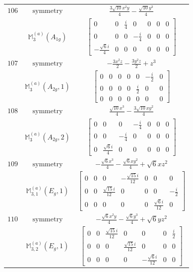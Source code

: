 \documentclass[fleqn,8pt,landscape]{jsarticle}
\begin{document}
\begin{longtable}{ccc}
$ 106 $ & $ \text{symmetry} $ & $ \frac{3 \sqrt{10} x^{2} y}{4} - \frac{\sqrt{10} y^{3}}{4} $ \\
$  $ & $ \mathbb{M}_{3}^{(a)}(A_{1g}) $ & $ \begin{bmatrix} 0 & 0 & \frac{i}{4} & 0 & 0 & 0 & 0 \\ 0 & 0 & 0 & - \frac{i}{4} & 0 & 0 & 0 \\ - \frac{\sqrt{6} i}{4} & 0 & 0 & 0 & 0 & 0 & 0 \end{bmatrix} $ \\ \hline
$ 107 $ & $ \text{symmetry} $ & $ - \frac{3 x^{2} z}{2} - \frac{3 y^{2} z}{2} + z^{3} $ \\
$  $ & $ \mathbb{M}_{3}^{(a)}(A_{2g},1) $ & $ \begin{bmatrix} 0 & 0 & 0 & 0 & 0 & - \frac{i}{2} & 0 \\ 0 & 0 & 0 & 0 & \frac{i}{2} & 0 & 0 \\ 0 & 0 & 0 & 0 & 0 & 0 & 0 \end{bmatrix} $ \\ \hline
$ 108 $ & $ \text{symmetry} $ & $ \frac{\sqrt{10} x^{3}}{4} - \frac{3 \sqrt{10} x y^{2}}{4} $ \\
$  $ & $ \mathbb{M}_{3}^{(a)}(A_{2g},2) $ & $ \begin{bmatrix} 0 & 0 & 0 & - \frac{i}{4} & 0 & 0 & 0 \\ 0 & 0 & - \frac{i}{4} & 0 & 0 & 0 & 0 \\ 0 & \frac{\sqrt{6} i}{4} & 0 & 0 & 0 & 0 & 0 \end{bmatrix} $ \\ \hline
$ 109 $ & $ \text{symmetry} $ & $ - \frac{\sqrt{6} x^{3}}{4} - \frac{\sqrt{6} x y^{2}}{4} + \sqrt{6} x z^{2} $ \\
$  $ & $ \mathbb{M}_{3,1}^{(a)}(E_{g},1) $ & $ \begin{bmatrix} 0 & 0 & 0 & - \frac{\sqrt{15} i}{12} & 0 & 0 & 0 \\ 0 & 0 & \frac{\sqrt{15} i}{12} & 0 & 0 & 0 & - \frac{i}{2} \\ 0 & 0 & 0 & 0 & 0 & \frac{\sqrt{6} i}{12} & 0 \end{bmatrix} $ \\ \hline
$ 110 $ & $ \text{symmetry} $ & $ - \frac{\sqrt{6} x^{2} y}{4} - \frac{\sqrt{6} y^{3}}{4} + \sqrt{6} y z^{2} $ \\
$  $ & $ \mathbb{M}_{3,2}^{(a)}(E_{g},1) $ & $ \begin{bmatrix} 0 & 0 & \frac{\sqrt{15} i}{12} & 0 & 0 & 0 & \frac{i}{2} \\ 0 & 0 & 0 & \frac{\sqrt{15} i}{12} & 0 & 0 & 0 \\ 0 & 0 & 0 & 0 & - \frac{\sqrt{6} i}{12} & 0 & 0 \end{bmatrix} $ \\ \hline

\end{longtable}
\end{document}
